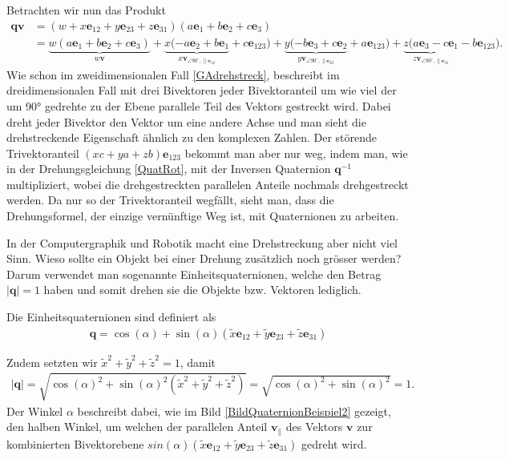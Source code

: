 Betrachten wir nun das Produkt
\begin{align}
\mathbf{qv} &= (w + x\mathbf{e}_{12} + y\mathbf{e}_{23} + z\mathbf{e}_{31})(a\mathbf{e}_1+b\mathbf{e}_2+c\mathbf{e}_3)\\
&= \underbrace{w(a\mathbf{e}_1+b\mathbf{e}_2+c\mathbf{e}_3)}_{\displaystyle{w\mathbf{v}}} + \underbrace{x(-a\mathbf{e}_2+b\mathbf{e}_1}_{\displaystyle{x\mathbf{v}_{\angle 90^\circ, \parallel \mathbf{e}_{12}}}}+c\mathbf{e}_{123}) + \underbrace{y(-b\mathbf{e}_3+c\mathbf{e}_2}_{\displaystyle{y\mathbf{v}_{\angle 90^\circ, \parallel \mathbf{e}_{23}}}}+a\mathbf{e}_{123}) + \underbrace{z(a\mathbf{e}_3-c\mathbf{e}_1}_{\displaystyle{z\mathbf{v}_{\angle 90^\circ, \parallel \mathbf{e}_{31}}}}-b\mathbf{e}_{123}).
\end{align}
Wie schon im zweidimensionalen Fall \eqref{GAdrehstreck}, beschreibt im dreidimensionalen Fall mit drei Bivektoren jeder Bivektoranteil um wie viel der um 90° gedrehte zu der Ebene parallele Teil des Vektors gestreckt wird. Dabei dreht jeder Bivektor den Vektor um eine andere Achse und man sieht die drehstreckende Eigenschaft ähnlich zu den komplexen Zahlen. Der störende Trivektoranteil $(xc+ya+zb)\mathbf{e}_{123}$ bekommt man aber nur weg, indem man, wie in der Drehungsgleichung \eqref{QuatRot}, mit der Inversen Quaternion $\mathbf{q}^{-1}$  multipliziert, wobei die drehgestreckten parallelen Anteile nochmals drehgestreckt werden. Da nur so der Trivektoranteil wegfällt, sieht man, dass die Drehungsformel, der einzige vernünftige Weg ist, mit Quaternionen zu arbeiten.

In der Computergraphik und Robotik macht eine Drehstreckung aber nicht viel Sinn. Wieso sollte ein Objekt bei einer Drehung zusätzlich noch grösser werden? Darum verwendet man sogenannte Einheitsquaternionen, welche den Betrag $|\mathbf{q}|=1$ haben und somit drehen sie die Objekte bzw. Vektoren lediglich.
\begin{definition}
	Die Einheitsquaternionen sind definiert als
	\begin{align}
	\mathbf{q} = \cos(\alpha) + \sin(\alpha)(\tilde{x}\mathbf{e}_{12} + \tilde{y}\mathbf{e}_{23} + \tilde{z}\mathbf{e}_{31})
	\end{align}
\end{definition}
Zudem setzten wir $\tilde{x}^2+\tilde{y}^2+\tilde{z}^2=1$, damit
\begin{align}
|\mathbf{q}| = \sqrt{\cos(\alpha)^2 + \sin(\alpha)^2(\tilde{x}^2+\tilde{y}^2+\tilde{z}^2) } = \sqrt{\cos(\alpha)^2 + \sin(\alpha)^2} = 1.
\end{align}
Der Winkel $\alpha$ beschreibt dabei, wie im Bild \ref{BildQuaternionBeispiel2} gezeigt, den halben Winkel, um welchen der parallelen Anteil $\mathbf{v_{\parallel}}$ des Vektors $\mathbf{v}$ zur kombinierten Bivektorebene $sin(\alpha)(\tilde{x}\mathbf{e}_{12} + \tilde{y}\mathbf{e}_{23} + \tilde{z}\mathbf{e}_{31})$ gedreht wird.

